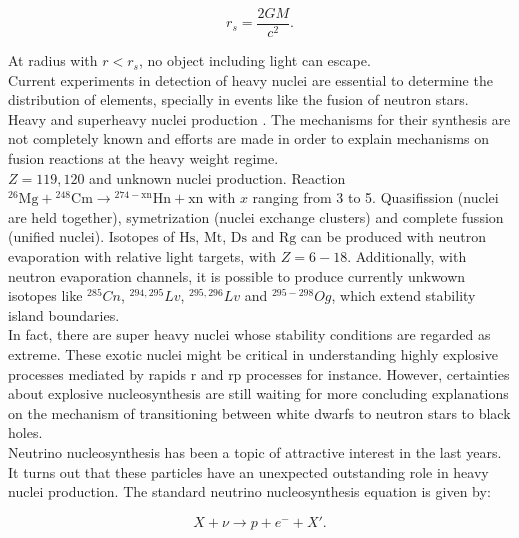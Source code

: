 \documentclass[openany]{book}
\begin{document}
\begin{equation}\label{eq:reaction_SchwarzschildRadius}
	r_s = \frac{2GM}{c^2}.
\end{equation}

At radius with $r < r_s$, no object including light can escape. \\ 

Current experiments in detection of heavy nuclei are essential to determine the distribution of elements, specially in events like the fusion of neutron stars. \\ 

Heavy and superheavy nuclei production \cite{adamian_antonenko_2022}. The mechanisms for their synthesis are not completely known and efforts are made in order to explain mechanisms on fusion reactions at the heavy weight regime.  \\

$Z = 119, 120$ and unknown nuclei production. Reaction $\mathrm{{}^{26}Mg + {}^{248}Cm \rightarrow {}^{274-xn}Hn +xn}$ with $x$ ranging from 3 to 5. Quasifission (nuclei are held together), symetrization (nuclei exchange clusters) and complete fussion (unified nuclei).  Isotopes of $\mathrm{Hs}$, $\mathrm{Mt}$, $\mathrm{Ds}$ and $\mathrm{Rg}$ can be produced with neutron evaporation with relative light targets, with $Z = 6-18$. Additionally, with neutron evaporation channels, it is possible to produce currently unkwown isotopes like $\mathrm{{}^{285}}Cn$, $\mathrm{{}^{294, 295}}Lv$, $\mathrm{{}^{295, 296}}Lv$ and $\mathrm{{}^{295-298}}Og$, which extend stability island boundaries. \\

In fact, there are super heavy nuclei whose stability conditions are regarded as extreme. These exotic nuclei might be critical in understanding highly explosive processes mediated by rapids r and rp processes for instance. However, certainties about explosive nucleosynthesis are still waiting for more concluding explanations on the mechanism of transitioning between white dwarfs to neutron stars to black holes. \\ 

Neutrino nucleosynthesis has been a topic of attractive interest in the last years. It turns out that these particles have an unexpected outstanding role in heavy nuclei production. The standard neutrino nucleosynthesis equation is given by: 

\begin{equation}\label{eq:reaction_neutrino}
	X + \nu \rightarrow p + e^{-} +  X'.
\end{equation}
\end{document}

